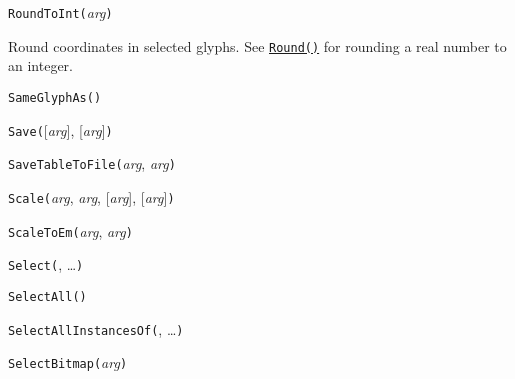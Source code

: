 

\texttt{RoundToInt(}\textit{arg}\texttt{)}

Round coordinates in selected glyphs.  See
\hyperref[func:Round]{\texttt{Round()}} for rounding a
real number to an integer.



\texttt{SameGlyphAs(}\texttt{)}



\texttt{Save(}[\textit{arg}], [\textit{arg}]\texttt{)}



\texttt{SaveTableToFile(}\textit{arg}, \textit{arg}\texttt{)}



\texttt{Scale(}\textit{arg}, \textit{arg}, [\textit{arg}], [\textit{arg}]\texttt{)}



\texttt{ScaleToEm(}\textit{arg}, \textit{arg}\texttt{)}



\texttt{Select(}, \ldots\texttt{)}



\texttt{SelectAll(}\texttt{)}



\texttt{SelectAllInstancesOf(}, \ldots\texttt{)}



\texttt{SelectBitmap(}\textit{arg}\texttt{)}



